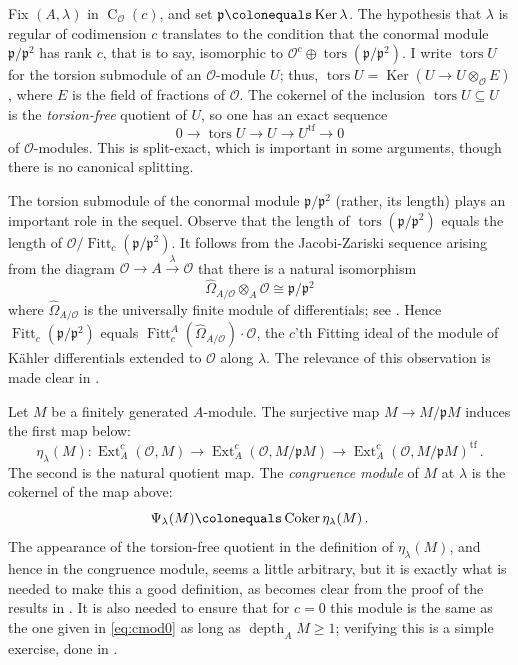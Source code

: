 \documentclass[twoside,leqno]{article}
\newcommand{\cato}{\operatorname{C}}
\newcommand{\Coker}{\operatorname{Coker}}
\newcommand{\cmod}{\Psi}
\newcommand{\depth}{\operatorname{depth}}
\newcommand{\ext}{\operatorname{Ext}}
\newcommand{\fitt}{\operatorname{Fitt}}
\newcommand{\fp}{{\mathfrak p}}
\newcommand{\Ker}{\operatorname{Ker}}
\newcommand{\mco}{\mathcal O}
\newcommand{\tors}{\operatorname{tors}}
\newcommand{\tfree}[1]{{#1}^{\operatorname{tf}}}
\begin{document}
Fix $(A,\lambda)$ in $\cato_\mco(c)$, and set $\fp\colonequals \Ker\lambda$. The hypothesis that $\lambda$ is regular of codimension $c$ translates to the condition that the conormal module $\fp/\fp^2$ has rank $c$, that is to say, isomorphic to $\mco^c\oplus \tors(\fp/\fp^2)$. I write $\tors U$ for the torsion submodule of an $\mco$-module $U$; thus, $\tors U=\Ker (U\to U\otimes_\mco E)$, where $E$ is the field of fractions of $\mco$. The cokernel of the inclusion $\tors U\subseteq U$ is the \emph{torsion-free} quotient of $U$, so one has an exact sequence 
\[
0\longrightarrow \tors U \longrightarrow U \longrightarrow \tfree U\longrightarrow 0
\]
of $\mco$-modules. This is split-exact, which is important in some arguments, though there is no canonical splitting. 

The torsion submodule of the conormal module $\fp/\fp^2$ (rather, its length) plays an important role in the sequel. Observe that the length of $\tors(\fp/\fp^2)$ equals the length of $\mco/\fitt_c(\fp/\fp^2)$. It follows from the Jacobi-Zariski sequence arising from the diagram $\mco\to A\xrightarrow{\lambda}\mco$ that there is a natural isomorphism
\begin{equation}
\label{eq:kahler-different}
\hat{\Omega}_{A/\mco}\otimes_A \mco \cong \fp/\fp^2
\end{equation}
where $\hat{\Omega}_{A/\mco}$ is the universally finite module of  differentials; see \cite[\S11]{Kunz:1986}.  Hence $\fitt_c(\fp/\fp^2)$ equals 
$\fitt^A_c(\hat{\Omega}_{A/\mco})\cdot \mco$, the $c$'th Fitting ideal of the module of K\"ahler differentials extended to $\mco$ along $\lambda$. The relevance of this observation is made clear in \cite[\S2.9]{Iyengar/Khare/Manning:2025a}.

Let $M$ be a finitely generated $A$-module. The surjective map $M\to M/\fp M$ induces the first map below:
\[
\eta_\lambda(M)\colon \ext^c_A(\mco,M)\longrightarrow \ext^c_A(\mco,M/\fp M)\longrightarrow \tfree{\ext^c_A(\mco,M/\fp M)}\,.
\]
The second is the natural quotient map.  The \emph{congruence module} of $M$ at $\lambda$ is the cokernel of the map above:
\[
\cmod_\lambda(M) \colonequals \Coker \eta_\lambda(M)\,.
\]
 The appearance of the torsion-free quotient in the definition of $\eta_\lambda(M)$, and hence in the congruence module, seems a little arbitrary, but it is exactly what is needed to make this a good definition, as becomes clear from the proof of the results in \cite[Part~1]{Iyengar/Khare/Manning:2024a}. It is also needed to ensure that for $c=0$ this module is the same as the one given in \eqref{eq:cmod0} as long as $\depth_AM\ge 1$; verifying this is a simple exercise, done in \cite[Proposition~2.10]{Iyengar/Khare/Manning:2024a}.
 
\end{document}
